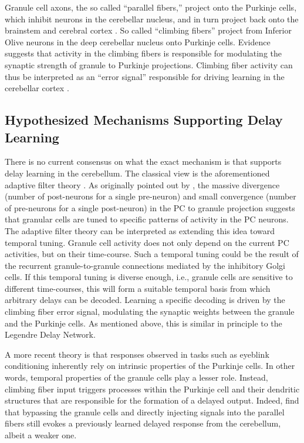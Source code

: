 Granule cell axons, the so called \enquote{parallel fibers,} project onto the Purkinje cells, which inhibit neurons in the cerebellar nucleus, and in turn project back onto the brainstem and cerebral cortex \citep{ito2010cerebellar,llinas2010olivocerebellar}. So called \enquote{climbing fibers} project from Inferior Olive neurons in the deep cerebellar nucleus onto Purkinje cells. 
Evidence suggests that activity in the climbing fibers is responsible for modulating the synaptic strength of granule to Purkinje projections. Climbing fiber activity can thus be interpreted as an \enquote{error signal} responsible for driving learning in the cerebellar cortex \citep{ito2010cerebellar}.

\subsection{Hypothesized Mechanisms Supporting Delay Learning}

There is no current consensus on what the exact mechanism is that supports delay learning in the cerebellum.
The classical view is the aforementioned adaptive filter theory \citep{fujita1982adaptive}.
As originally pointed out by \citep{marr1969theory}, the massive divergence (number of post-neurons for a single pre-neuron) and small convergence (number of pre-neurons for a single post-neuron) in the PC to granule projection suggests that granular cells are tuned to specific patterns of activity in the PC neurons.
The adaptive filter theory can be interpreted as extending this idea toward temporal tuning.
Granule cell activity does not only depend on the current PC activities, but on their time-course. Such a temporal tuning could be the result of the recurrent granule-to-granule connections mediated by the inhibitory Golgi cells.
If this temporal tuning is diverse enough, i.e., granule cells are sensitive to different time-courses, this will form a suitable temporal basis from which arbitrary delays can be decoded.
Learning a specific decoding is driven by the climbing fiber error signal, modulating the synaptic weights between the granule and the Purkinje cells.
As mentioned above, this is similar in principle to the Legendre Delay Network.

A more recent theory is that responses observed in tasks such as eyeblink conditioning inherently rely on intrinsic properties of the Purkinje cells.
In other words, temporal properties of the granule cells play a lesser role.
Instead, climbing fiber input triggers processes within the Purkinje cell and their dendritic structures that are responsible for the formation of a delayed output.
Indeed, \citet{johansson2014memory} find that bypassing the granule cells and directly injecting signals into the parallel fibers still evokes a previously learned delayed response from the cerebellum, albeit a weaker one.

